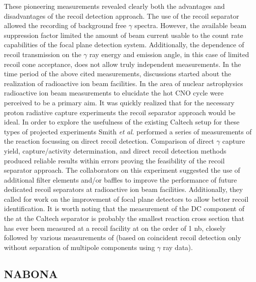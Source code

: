 These pioneering measurements revealed clearly both the advantages and disadvantages of the recoil detection approach. The use of the recoil separator allowed the recording of background free $\gamma$ spectra. However, the available beam suppression factor limited the amount of beam current usable to the count rate capabilities of the focal plane detection system. Additionally, the dependence of recoil transmission on the $\gamma$ ray energy and emission angle, in this case of limited recoil cone acceptance, does not allow truly independent measurements. In the time period of the above cited measurements, discussions started about the realization of radioactive ion beam facilities. In the area of nuclear astrophysics radioactive ion beam measurements to elucidate the hot CNO cycle were perceived to be a primary aim. It was quickly realized that for the necessary proton radiative capture experiments the recoil separator approach would be ideal. In order to explore the usefulness of the existing Caltech setup for these types of projected experiments Smith {\it et al.} \cite{smit91} performed a series of measurements of the  reaction focussing on direct  recoil detection. Comparison of direct $\gamma$ capture yield,  capture/activity determination, and  direct recoil detection methods produced reliable results within errors proving the feasibility of the recoil separator approach. The collaborators on this experiment suggested the use of additional filter elements and/or baffles to improve the performance of future dedicated recoil separators at radioactive ion beam facilities. Additionally, they called for work on the improvement of focal plane detectors to allow better recoil identification. It is worth noting that the measurement of the DC component of the \reac{\alpha}{\gamma} at the Caltech separator \cite{hahn87} is probably the smallest reaction cross section that has ever been measured at a recoil facility at on the order of 1 \unit{nb}, closely followed by various measurements of \reac{\alpha}{\gamma} (based on coincident recoil detection only without separation of multipole components using $\gamma$ ray data). 

\subsection{NABONA}

